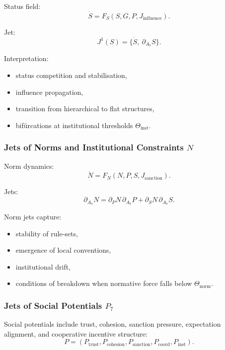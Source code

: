 Status field:
\[
\dot{S}=F_S(S,G,P,J_{\mathrm{influence}}).
\]

Jet:
\[
J^1(S)=\{\dot{S},\ \partial_{A_7}S\}.
\]

Interpretation:
\begin{itemize}
    \item status competition and stabilisation,
    \item influence propagation,
    \item transition from hierarchical to flat structures,
    \item bifürcations at institutional thresholds $\Theta_{\mathrm{inst}}$.
\end{itemize}


\subsubsection{Jets of Norms and Institutional Constraints \texorpdfstring{$N$}{N}}

Norm dynamics:
\[
\dot{N} = F_N(N,P,S,J_{\mathrm{sanction}}).
\]

Jets:
\[
\partial_{A_7}N
=
\partial_P N\, \partial_{A_7}P
+
\partial_S N\, \partial_{A_7}S.
\]

Norm jets capture:
\begin{itemize}
    \item stability of rule-sets,
    \item emergence of local conventions,
    \item institutional drift,
    \item conditions of breakdown when normative force falls below
          $\Theta_{\mathrm{norm}}$.
\end{itemize}


\subsubsection{Jets of Social Potentials \texorpdfstring{$P_7$}{P_7}}

Social potentials include trust, cohesion, sanction pressure, expectation
alignment, and cooperative incentive structure:
\[
P = (P_{\mathrm{trust}}, P_{\mathrm{cohesion}}, P_{\mathrm{sanction}},
P_{\mathrm{coord}}, P_{\mathrm{inst}}).
\]

